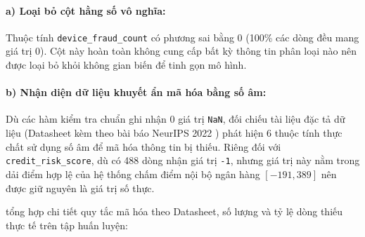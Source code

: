 \paragraph{a) Loại bỏ cột hằng số vô nghĩa:}
Thuộc tính \texttt{device\_fraud\_count} có phương sai bằng 0 (100\% các dòng đều mang giá trị $0$). Cột này hoàn toàn không cung cấp bất kỳ thông tin phân loại nào nên được loại bỏ khỏi không gian biến để tinh gọn mô hình.

\paragraph{b) Nhận diện dữ liệu khuyết ẩn mã hóa bằng số âm:}
Dù các hàm kiểm tra chuẩn ghi nhận 0 giá trị \texttt{NaN}, đối chiếu tài liệu đặc tả dữ liệu (Datasheet kèm theo bài báo NeurIPS 2022 \cite{jesus2022turning}) phát hiện 6 thuộc tính thực chất sử dụng số âm để mã hóa thông tin bị thiếu. Riêng đối với \texttt{credit\_risk\_score}, dù có 488 dòng nhận giá trị \texttt{-1}, nhưng giá trị này nằm trong dải điểm hợp lệ của hệ thống chấm điểm nội bộ ngân hàng $[-191, 389]$ nên được giữ nguyên là giá trị số thực.

 tổng hợp chi tiết quy tắc mã hóa theo Datasheet, số lượng và tỷ lệ dòng thiếu thực tế trên tập huấn luyện:

\begin{table}[H]
  \centering
  \caption{Thống kê số lượng dữ liệu khuyết ẩn theo quy tắc Datasheet \cite{jesus2022turning} trên tập huấn luyện (794.989 hồ sơ).}
  \label{tab:tab_missing_summary}
\end{table}

